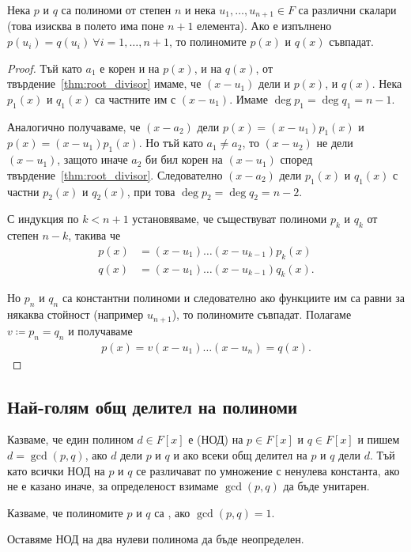 \documentclass[numbers=endperiod, bibliography=totocnumbered]{scrartcl}
\begin{document}
\begin{theorem}\label{thm:coefficient_comparison_principle}
  Нека \( p \) и \( q \) са полиноми от степен \( n \) и нека \( u_1, \ldots, u_{n+1} \in F \) са различни скалари (това изисква в полето има поне \( n+1 \) елемента). Ако е изпълнено \( p(u_i) = q(u_i)~\forall i = 1, \ldots, n + 1 \), то полиномите \( p(x) \) и \( q(x) \) съвпадат.
\end{theorem}
\begin{proof}
  Тъй като \( a_1 \) е корен и на \( p(x) \), и на \( q(x) \), от твърдение~\ref{thm:root_divisor} имаме, че \( (x - u_1) \) дели и \( p(x) \), и \( q(x) \). Нека \( p_1(x) \) и \( q_1(x) \) са частните им с \( (x - u_1) \). Имаме \( \deg p_1 = \deg q_1 = n - 1 \).

  Аналогично получаваме, че \( (x - a_2) \) дели \( p(x) = (x - u_1) p_1(x) \) и \( p(x) = (x - u_1) p_1(x) \). Но тъй като \( a_1 \neq a_2 \), то \( (x - u_2) \) не дели \( (x - u_1) \), защото иначе \( a_2 \) би бил корен на \( (x - u_1) \) според твърдение~\ref{thm:root_divisor}. Следователно \( (x - a_2) \) дели \( p_1(x) \) и \( q_1(x) \) с частни \( p_2(x) \) и \( q_2(x) \), при това \( \deg p_2 = \deg q_2 = n - 2 \).

  С индукция по \( k < n + 1 \) установяваме, че съществуват полиноми \( p_k \) и \( q_k \) от степен \( n - k \), такива че
  \begin{align*}
    p(x) &= (x - u_1) \ldots (x - u_{k-1}) p_k(x) \\
    q(x) &= (x - u_1) \ldots (x - u_{k-1}) q_k(x).
  \end{align*}

  Но \( p_n \) и \( q_n \) са константни полиноми и следователно ако функциите им са равни за някаква стойност (например \( u_{n+1} \)), то полиномите съвпадат. Полагаме \( v \coloneqq p_n = q_n \) и получаваме
  \begin{align*}
    p(x) = v (x - u_1) \ldots (x - u_n) = q(x).
  \end{align*}
\end{proof}

\subsection{Най-голям общ делител на полиноми}

\begin{definition}
  Казваме, че един полином \( d \in F[x] \) е  (НОД) на \( p \in F[x] \) и \( q \in F[x] \) и пишем \( d = \gcd(p, q) \), ако \( d \) дели \( p \) и \( q \) и ако всеки общ делител на \( p \) и \( q \) дели \( d \). Тъй като всички НОД на \( p \) и \( q \) се различават по умножение с ненулева константа, ако не е казано иначе, за определеност взимаме \( \gcd(p, q) \) да бъде унитарен.

  Казваме, че полиномите \( p \) и \( q \) са , ако \( \gcd(p, q) = 1 \).

  Оставяме НОД на два нулеви полинома да бъде неопределен.
\end{definition}
\end{document}

